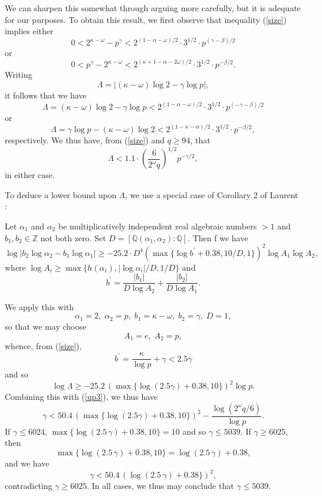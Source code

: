 \documentclass{amsart}
\newcommand{\Q}{{\mathbb Q}}
\newcommand{\Z}{{\mathbb Z}}
\begin{document}
{ We can sharpen this somewhat through arguing more carefully, but it is adequate for our purposes.
 To obtain this result, we first observe that 
 inequality (\ref{size})  implies  either
 $$
0 <  2^{\kappa-\omega} - p^\gamma  < 2^{(1-\alpha-\omega)/2} \cdot 3^{1/2} \cdot p^{(\gamma-\beta)/2}
 $$
 or
 $$
 0< p^\gamma - 2^{\kappa-\omega}  < 
 2^{(\kappa+1-\alpha-2\omega)/2} \cdot 3^{1/2} \cdot p^{-\beta/2}.
 $$
Writing
$$
\Lambda = \left| (\kappa-\omega) \log 2 - \gamma \log p \right|,
$$
 it follows that we have
 \begin{equation} \label{up1}
 \Lambda = (\kappa-\omega) \log 2 - \gamma \log p < 2^{(1-\alpha-\omega)/2} \cdot 3^{1/2} \cdot p^{(-\gamma-\beta)/2}
 \end{equation}
 or
  \begin{equation} \label{up2}
 \Lambda =  \gamma \log p -  (\kappa-\omega) \log 2< 2^{(1-\kappa-\alpha)/2} \cdot 3^{1/2} \cdot p^{-\beta/2},
 \end{equation}
 respectively. We thus have, from (\ref{size}) and $q \geq 94$, that
 \begin{equation} \label{up3}
 \Lambda < 1.1 \cdot \left( \frac{6}{2^\omega q} \right)^{1/2} p^{-\gamma/2},
  \end{equation}
 in either case.
 
To deduce a lower bound upon $\Lambda$, we use a special case of Corollary 2 of Laurent \cite{Laurent2008}:


\begin{cor}[Laurent]\label{cor:Laurent}
Let $\alpha_1$ and $\alpha_2$ be multiplicatively independent real algebraic numbers $>1$ and $b_1,b_2 \in \Z$ not both zero.
Set $D = [\Q(\alpha_1, \alpha_2): \Q]$.
Then f we have
\[
	\log | b_2 \log \alpha_2 - b_1 \log \alpha_1|
	\geq -25.2 \cdot D^4 \left( \max \{ \log b^\prime + 0.38, 10/D, 1 \} \right)^2 \log A_1 \log A_2,
\]
where $\log A_i \geq \max \{ h(\alpha_i), |\log \alpha_i|/D, 1/D \}$ and
\[
	b^\prime = \frac{|b_1|}{D \log A_2} + \frac{|b_2|}{D \log A_1}.
\]
\end{cor}

We apply this with
$$
\alpha_1=2, \; \alpha_2=p, \; b_1=\kappa-\omega, \; b_2=\gamma, \; D=1,
$$
so that we may choose 
$$
A_1=e, \; A_2=p, 
$$
whence, from (\ref{size}), 
$$
b^\prime = \frac{\kappa}{\log p} + \gamma< 2.5 \gamma
$$
and so
\begin{equation} \label{LFL-lower}
\log \Lambda \geq -25.2 \, \left( \max \{ \log(2.5 \gamma) + 0.38, 10 \} \right)^2 \log p.
\end{equation}	 
Combining this with (\ref{up3}), we thus have
\begin{equation} \label{fritz}
\gamma < 50.4 \, \left( \max \{ \log(2.5 \gamma) + 0.38, 10 \} \right)^2 - \frac{\log (2^\omega q/6)}{\log p}.
\end{equation}
If $\gamma \leq 6024$, $\max \{ \log(2.5 \,\gamma) + 0.38, 10 \}  = 10$ and so $\gamma \leq 5039$. If $\gamma \geq 6025$, then 
$$
\max \{ \log(2.5 \,\gamma) + 0.38, 10 \}  = \log(2.5 \,\gamma) + 0.38, 
$$
and we have
 $$
\gamma < 50.4 \, \left( \log(2.5 \,\gamma) + 0.38 \} \right)^2,
$$
contradicting $\gamma \geq 6025$. In all cases, we thus may conclude that $\gamma \leq 5039$.

}
\end{document}
